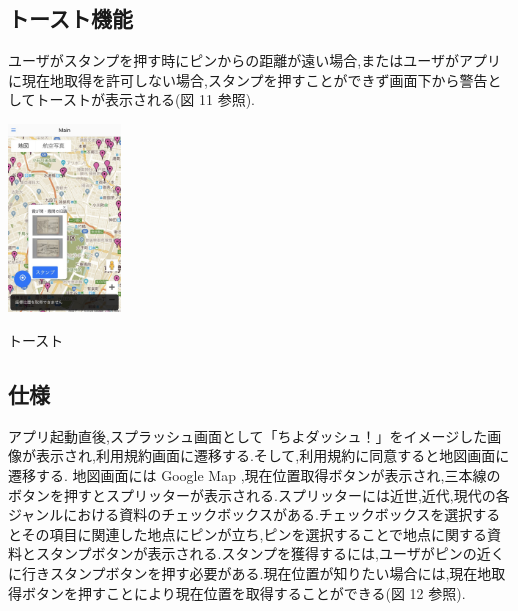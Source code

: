 \documentclass[a4paper, twoside]{jarticle}
\makeatletter
\newenvironment{figurehere}
  {\def\@captype{figure}}
  {}
\makeatother
\begin{document}
\begin{multicols}{2}
\subsection{トースト機能}
ユーザがスタンプを押す時にピンからの距離が遠い場合,またはユーザがアプリに現在地取得を許可しない場合,スタンプを押すことができず画面下から警告としてトーストが表示される(図 11 参照).
\begin{figurehere}
\begin{center}
\includegraphics[bb=30 50 550 1300,width=3cm]{./image11.jpg}%
\end{center}
\caption{トースト}\label{fig:11}
\end{figurehere}



\subsection{仕様}
アプリ起動直後,スプラッシュ画面として「ちよダッシュ！」をイメージした画像が表示され,利用規約画面に遷移する.そして,利用規約に同意すると地図画面に遷移する.
地図画面には Google Map ,現在位置取得ボタンが表示され,三本線のボタンを押すとスプリッターが表示される.スプリッターには近世,近代,現代の各ジャンルにおける資料のチェックボックスがある.チェックボックスを選択するとその項目に関連した地点にピンが立ち,ピンを選択することで地点に関する資料とスタンプボタンが表示される.スタンプを獲得するには,ユーザがピンの近くに行きスタンプボタンを押す必要がある.現在位置が知りたい場合には,現在地取得ボタンを押すことにより現在位置を取得することができる(図 12 参照).


\end{multicols}
\end{document}
